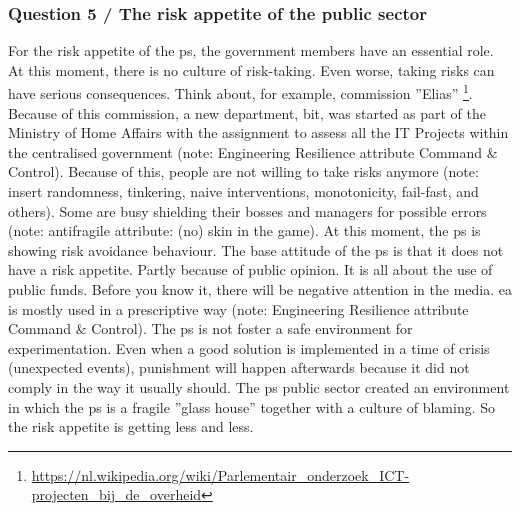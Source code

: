 \subsubsection{Question 5 / The risk appetite of the public sector}
For the risk appetite of the \gls{ps}, the government members have an essential role. At this moment, there is no culture of risk-taking. Even worse, taking risks can have serious consequences. Think about, for example, commission ''Elias'' \footnote{\url{https://nl.wikipedia.org/wiki/Parlementair_onderzoek_ICT-projecten_bij_de_overheid}}. Because of this commission, a new department, \acrfull{bit}, was started as part of the Ministry of Home Affairs with the assignment to assess all the IT Projects within the centralised government (note: Engineering Resilience attribute Command \& Control). Because of this, people are not willing to take risks anymore (note: insert randomness, tinkering, naive interventions, monotonicity, fail-fast, and others). Some are busy shielding their bosses and managers for possible errors (note: \gls{antifragile} attribute: (no) skin in the game). At this moment, the \gls{ps} is showing risk avoidance behaviour. The base attitude of the \gls{ps} is that it does not have a risk appetite. Partly because of public opinion. It is all about the use of public funds. Before you know it, there will be negative attention in the media. \acrshort{ea} is mostly used in a prescriptive way (note: Engineering Resilience attribute Command \& Control). The \gls{ps} is not foster a safe environment for experimentation. Even when a good solution is implemented in a time of crisis (unexpected events), punishment will happen afterwards because it did not comply in the way it usually should. The \gls{ps} public sector created an environment in which the \gls{ps} is a fragile ''glass house'' together with a culture of blaming. So the risk appetite is getting less and less.
